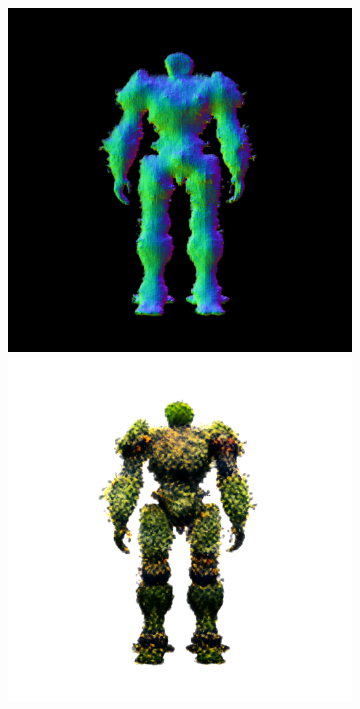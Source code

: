 \begin{figure}[ht]
\begin{subfigure}[b]{0.222\textwidth}
        \includegraphics[width=\textwidth]{figures/appendix/magic123_coarse_robot_back_5000_part2.png}
        \includegraphics[width=\textwidth]{figures/appendix/magic123_coarse_robot_back_5000_part1.png}

\end{subfigure}
\end{figure}
